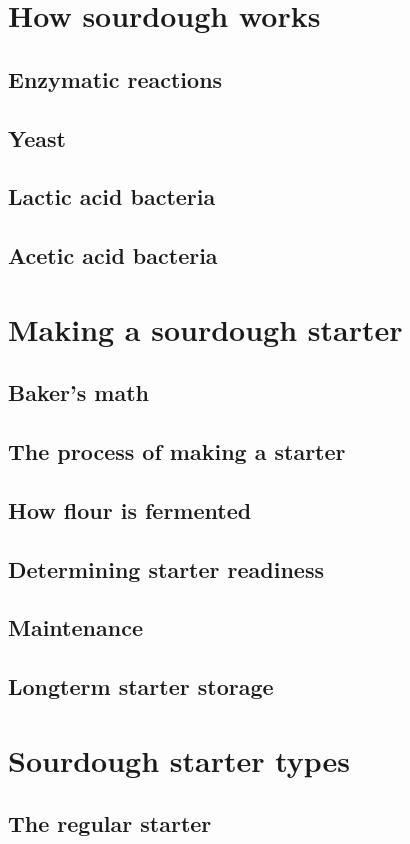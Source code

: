 \documentclass[a4paper, 12pt]{book}
\begin{document}
\chapter{How sourdough works}
\section{Enzymatic reactions}
\section{Yeast}
\section{Lactic acid bacteria}
\section{Acetic acid bacteria}

\chapter{Making a sourdough starter}
\section{Baker's math}
\section{The process of making a starter}
\section{How flour is fermented}
\section{Determining starter readiness}
\section{Maintenance}
\section{Longterm starter storage}

\chapter{Sourdough starter types}
\section{The regular starter}
\end{document}
